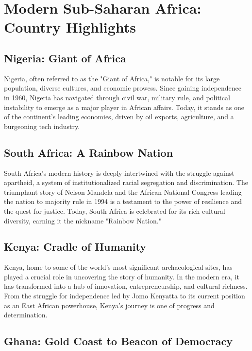 \documentclass{book}
\begin{document}
\section{Modern Sub-Saharan Africa: Country Highlights}
\label{sec:modern-sub-saharan-africa}

\subsection{Nigeria: Giant of Africa}
\label{subsec:nigeria}

Nigeria, often referred to as the "Giant of Africa," is notable for its large population, diverse cultures, and economic prowess. Since gaining independence in 1960, Nigeria has navigated through civil war, military rule, and political instability to emerge as a major player in African affairs. Today, it stands as one of the continent’s leading economies, driven by oil exports, agriculture, and a burgeoning tech industry.

\subsection{South Africa: A Rainbow Nation}
\label{subsec:south-africa}

South Africa’s modern history is deeply intertwined with the struggle against apartheid, a system of institutionalized racial segregation and discrimination. The triumphant story of Nelson Mandela and the African National Congress leading the nation to majority rule in 1994 is a testament to the power of resilience and the quest for justice. Today, South Africa is celebrated for its rich cultural diversity, earning it the nickname "Rainbow Nation."

\subsection{Kenya: Cradle of Humanity}
\label{subsec:kenya}

Kenya, home to some of the world's most significant archaeological sites, has played a crucial role in uncovering the story of humanity. In the modern era, it has transformed into a hub of innovation, entrepreneurship, and cultural richness. From the struggle for independence led by Jomo Kenyatta to its current position as an East African powerhouse, Kenya's journey is one of progress and determination.

\subsection{Ghana: Gold Coast to Beacon of Democracy}
\label{subsec:ghana}
\end{document}
